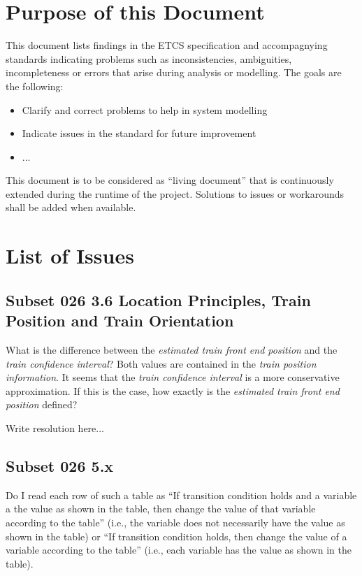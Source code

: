 \documentclass{template/openetcs_article}
\begin{document}
\tableofcontents
\newpage



\section{Purpose of this Document}

  This document lists findings in the ETCS specification and accompagnying standards indicating problems such as inconsistencies, ambiguities, incompleteness or errors that arise during analysis or modelling. The goals are the following:
  \begin{itemize}
    \item Clarify and correct problems to help in system modelling
    \item Indicate issues in the standard for future improvement
    \item ... 
  \end{itemize}

This document is to be considered as ``living document'' that is continuously extended during the runtime of the project. Solutions to issues or workarounds shall be added when available.



\section{List of Issues}

\subsection{Subset 026 3.6 Location Principles, Train Position and Train Orientation}

What is the difference between the \emph{estimated train front end position} and the \emph{train confidence interval}? Both values are contained in the \emph{train position information}. It seems that the \emph{train confidence interval} is a more conservative approximation. If this is the case, how exactly is the \emph{estimated train front end position} defined?

\resolution Write resolution here...

\subsection{Subset 026 5.x}

Do I read each row of such a table as ``If transition condition holds and a variable a the value as shown in the table, then change the value of that variable according to the table'' (i.e., the variable does not necessarily have the value as shown in the table) or ``If transition condition holds, then change the value of a variable according to the table'' (i.e., each variable has the value as shown in the table).
\end{document}
